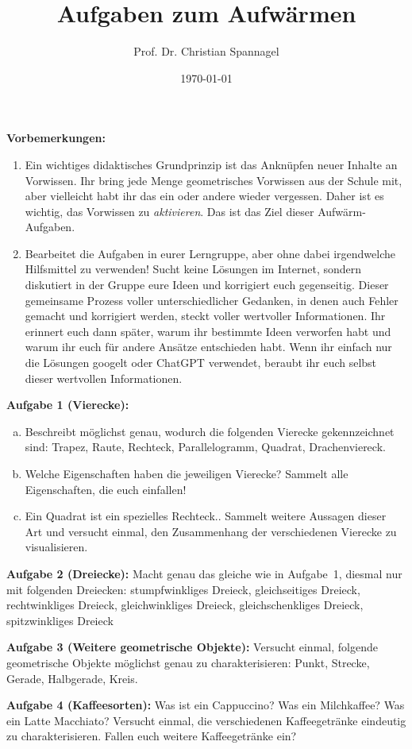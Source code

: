 \documentclass{../cssheet}
\title{Aufgaben zum Aufwärmen}
\author{Prof. Dr. Christian Spannagel}
\date{\today}
\begin{document}
\printtitle

\textbf{Vorbemerkungen:} 
\begin{enumerate}
\item Ein wichtiges didaktisches Grundprinzip ist das Anknüpfen neuer Inhalte an Vorwissen. Ihr bring jede Menge geometrisches Vorwissen aus der Schule mit, aber vielleicht habt ihr das ein oder andere wieder vergessen. Daher ist es wichtig, das Vorwissen zu \emph{aktivieren}. Das ist das Ziel dieser Aufwärm-Aufgaben.
\item Bearbeitet die Aufgaben in eurer Lerngruppe, aber ohne dabei irgendwelche Hilfsmittel zu verwenden! Sucht keine Lösungen im Internet, sondern diskutiert in der Gruppe eure Ideen und korrigiert euch gegenseitig. Dieser gemeinsame Prozess voller unterschiedlicher Gedanken, in denen auch Fehler gemacht und korrigiert werden, steckt voller wertvoller Informationen. Ihr erinnert euch dann später, warum ihr bestimmte Ideen verworfen habt und warum ihr euch für andere Ansätze entschieden habt. Wenn ihr einfach nur die Lösungen googelt oder ChatGPT verwendet, beraubt ihr euch selbst dieser wertvollen Informationen.
\end{enumerate}


\textbf{Aufgabe 1 (Vierecke):}  
\begin{enumerate}[a)]
\item Beschreibt möglichst genau, wodurch die folgenden Vierecke gekennzeichnet sind: Trapez, Raute, Rechteck, Parallelogramm, Quadrat, Drachenviereck.
\item Welche Eigenschaften haben die jeweiligen Vierecke? Sammelt alle Eigenschaften, die euch einfallen!
\item \glqq{}Ein Quadrat ist ein spezielles Rechteck.\grqq{}. Sammelt weitere Aussagen dieser Art und versucht einmal, den Zusammenhang der verschiedenen Vierecke zu visualisieren.
\end{enumerate}

\textbf{Aufgabe 2 (Dreiecke):} Macht genau das gleiche wie in Aufgabe~1, diesmal nur mit folgenden Dreiecken: stumpfwinkliges Dreieck, gleichseitiges Dreieck, rechtwinkliges Dreieck, gleichwinkliges Dreieck, gleichschenkliges Dreieck, spitzwinkliges Dreieck

\textbf{Aufgabe 3 (Weitere geometrische Objekte):} Versucht einmal, folgende geometrische Objekte möglichst genau zu charakterisieren: Punkt, Strecke, Gerade, Halbgerade, Kreis.

\textbf{Aufgabe 4 (Kaffeesorten):} Was ist ein Cappuccino? Was ein Milchkaffee? Was ein Latte Macchiato? Versucht einmal, die verschiedenen Kaffeegetränke eindeutig zu charakterisieren. Fallen euch weitere Kaffeegetränke ein?


\vspace*{10mm}
\printlicense

\printsocials


\end{document}
